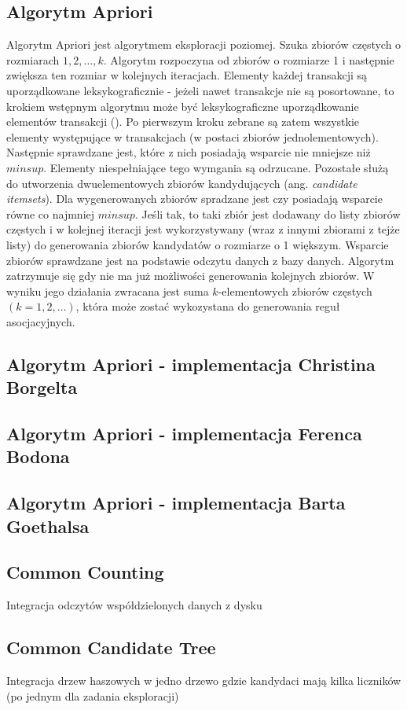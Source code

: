 \subsection{Algorytm Apriori \cite{Agrawal}}
\label{c321}
Algorytm Apriori jest algorytmem eksploracji poziomej. Szuka zbiorów częstych o rozmiarach \(1, 2,\dots , k\). Algorytm rozpoczyna od zbiorów o rozmiarze 1 i następnie zwiększa ten rozmiar w kolejnych iteracjach. Elementy każdej transakcji są uporządkowane leksykograficznie - jeżeli nawet transakcje nie są posortowane, to krokiem wstępnym algorytmu może być leksykograficzne uporządkowanie elementów transakcji (\cite{Morzy}). Po pierwszym kroku zebrane są zatem wszystkie elementy występujące w transakcjach (w postaci zbiorów jednolementowych). Następnie sprawdzane jest, które z nich posiadają wsparcie nie mniejsze niż \(minsup\). Elementy niespełniające tego wymgania są odrzucane. Pozostałe służą do utworzenia dwuelementowych zbiorów kandydujących (ang. \textit{candidate itemsets}). Dla wygenerowanych zbiorów spradzane jest czy posiadają wsparcie równe co najmniej \(minsup\). Jeśli tak, to taki zbiór jest dodawany do listy zbiorów częstych i w kolejnej iteracji jest wykorzystywany (wraz z innymi zbiorami z tejże listy) do generowania zbiorów kandydatów o rozmiarze o 1 większym. Wsparcie zbiorów sprawdzane jest na podstawie odczytu danych z bazy danych. Algorytm zatrzymuje się gdy nie ma już możliwości generowania kolejnych zbiorów. W wyniku jego działania zwracana jest suma \(k\)-elementowych zbiorów częstych \((k = 1, 2,\dots)\), która może zostać wykozystana do generowania reguł asocjacyjnych.

\subsection{Algorytm Apriori - implementacja Christina Borgelta \cite{Borgelt}}
\label{c322}

\subsection{Algorytm Apriori - implementacja Ferenca Bodona \cite{Bodon}}
\label{c323}

\subsection{Algorytm Apriori - implementacja Barta Goethalsa \cite{Goethals}}
\label{c324}


\subsection{Common Counting \cite{WojciechowskiCC}}
\label{c325}
Integracja odczytów współdzielonych danych z dysku

\subsection{Common Candidate Tree \cite{WojciechowskiCCT}}
\label{c326}
Integracja drzew haszowych w jedno drzewo gdzie kandydaci mają kilka liczników (po jednym dla zadania eksploracji)